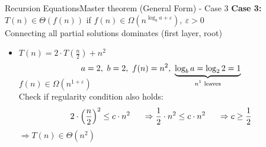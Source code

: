 \begin{frame}{Recursion Equations}{Master theorem (General Form) - Case 3}
  \textbf{Case 3:}
  {\color{Mittel-Gruen}$T(n) \in \Theta(f(n))$}
  \hfill if {\color{Mittel-Blau}
    $f(n) \in \Omega(n^{\log_b a+\varepsilon}), ~ \varepsilon > 0$
  }\\
  {\color{gray}Connecting all partial solutions dominates (first layer, root)}
  \vspace{1.0em}
  \begin{itemize}
    \item
      $T(n) = 2 \cdot T(\tfrac{n}{2}) + n^2$
      \vspace{-0.5em}
      \begin{displaymath}
        a = 2, ~ b = 2, ~ f(n) = n^2, ~
        \smash{\underbrace{
          \log_b a = \log_2 2 = 1
        }_{\text{$n^1$ leaves}}}
      \end{displaymath}
      {\color{Mittel-Blau}$f(n) \in \Omega(n^{1+\varepsilon})$}\\[1.0em]
      Check if {\color{Mittel-Blau}regularity condition} also holds:\\
      \begin{displaymath}
        2 \cdot \left(\frac{n}{2}\right)^2 \leq c \cdot n^2
        \hspace{1.5em} \Rightarrow \frac{1}{2} \cdot n^2 \leq c \cdot n^2
        \hspace{1.5em} \Rightarrow c \geq \frac{1}{2}
      \end{displaymath}
      {\color{Mittel-Blau}$\Rightarrow T(n) \in \Theta(n^2)$}
  \end{itemize}
\end{frame}


